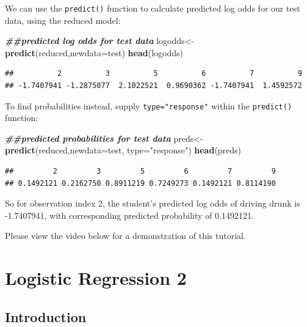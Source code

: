 \documentclass[
]{book}
\newenvironment{Shaded}{\begin{snugshade}}{\end{snugshade}}
\newcommand{\AttributeTok}[1]{\textcolor[rgb]{0.13,0.29,0.53}{#1}}
\newcommand{\DocumentationTok}[1]{\textcolor[rgb]{0.56,0.35,0.01}{\textbf{\textit{#1}}}}
\newcommand{\FunctionTok}[1]{\textcolor[rgb]{0.13,0.29,0.53}{\textbf{#1}}}
\newcommand{\NormalTok}[1]{#1}
\newcommand{\OtherTok}[1]{\textcolor[rgb]{0.56,0.35,0.01}{#1}}
\newcommand{\StringTok}[1]{\textcolor[rgb]{0.31,0.60,0.02}{#1}}
\begin{document}
We can use the \texttt{predict()} function to calculate predicted log odds for our test data, using the reduced model:

\begin{Shaded}
\begin{Highlighting}[]
\DocumentationTok{\#\#predicted log odds for test data}
\NormalTok{logodds}\OtherTok{\textless{}{-}}\FunctionTok{predict}\NormalTok{(reduced,}\AttributeTok{newdata=}\NormalTok{test)}
\FunctionTok{head}\NormalTok{(logodds)}
\end{Highlighting}
\end{Shaded}

\begin{verbatim}
##          2          3          5          6          7          9 
## -1.7407941 -1.2875077  2.1022521  0.9690362 -1.7407941  1.4592572
\end{verbatim}

To find probabilities instead, supply \texttt{type="response"} within the \texttt{predict()} function:

\begin{Shaded}
\begin{Highlighting}[]
\DocumentationTok{\#\#predicted probabilities for test data}
\NormalTok{preds}\OtherTok{\textless{}{-}}\FunctionTok{predict}\NormalTok{(reduced,}\AttributeTok{newdata=}\NormalTok{test, }\AttributeTok{type=}\StringTok{"response"}\NormalTok{)}
\FunctionTok{head}\NormalTok{(preds)}
\end{Highlighting}
\end{Shaded}

\begin{verbatim}
##         2         3         5         6         7         9 
## 0.1492121 0.2162750 0.8911219 0.7249273 0.1492121 0.8114190
\end{verbatim}

So for observation index 2, the student's predicted log odds of driving drunk is -1.7407941, with corresponding predicted probability of 0.1492121.

Please view the video below for a demonstration of this tutorial.

\hypertarget{logistic2}{%
\chapter{Logistic Regression 2}\label{logistic2}}

\hypertarget{introduction-11}{%
\section{Introduction}\label{introduction-11}}
\end{document}
